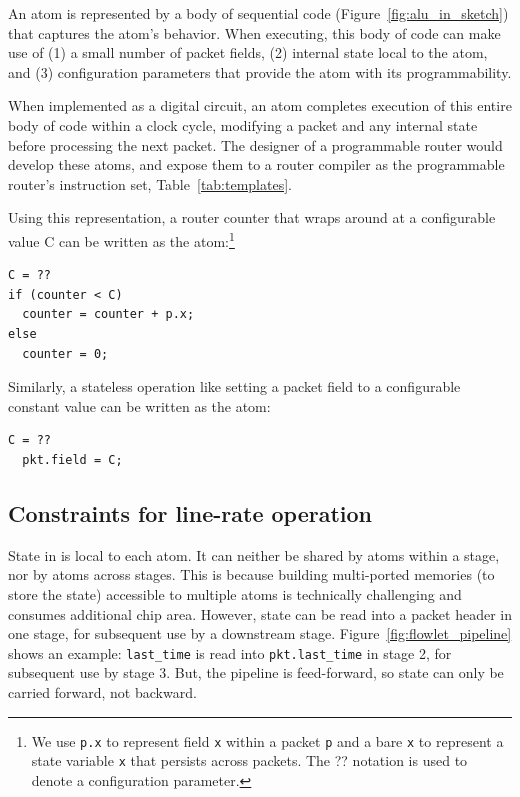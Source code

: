 An atom is represented by a body of sequential code
(Figure~\ref{fig:alu_in_sketch}) that captures the atom's behavior. When
executing, this body of code can make use of (1) a small number of packet
fields, (2) internal state local to the atom, and (3) configuration parameters
that provide the atom with its programmability.

When implemented as a digital circuit, an atom completes execution of this
entire body of code within a clock cycle, modifying a packet and any internal
state before processing the next packet. The designer of a programmable router
would develop these atoms, and expose them to a router compiler as the
programmable router's instruction set, \eg Table~\ref{tab:templates}.

Using this representation, a router counter that wraps around at a configurable
value C can be written as the atom:\footnote{We use {\tt p.x} to represent
field {\tt x} within a packet {\tt p} and a bare {\tt x} to represent a state
variable {\tt x} that persists across packets. The ?? notation is used to
denote a configuration parameter.}
\begin{lstlisting}[style=customc, numbers=none, frame=none]
C = ??
if (counter < C)
  counter = counter + p.x;
else
  counter = 0;
\end{lstlisting}

Similarly, a stateless operation like setting a packet field to a configurable
constant value can be written as the atom:
\begin{lstlisting}[style=customc, numbers=none, frame=none]
  C = ??
  pkt.field = C;
\end{lstlisting}

\subsection{Constraints for line-rate operation}
\label{s:atomConstraints}

 State in \absmachine is local to each atom.  It can
neither be shared by atoms within a stage, nor by atoms across stages. This is
because building multi-ported memories (to store the state) accessible to
multiple atoms is technically challenging and consumes additional chip area.
However, state can be read into a packet header in one stage, for subsequent
use by a downstream stage. Figure~\ref{fig:flowlet_pipeline} shows an example:
{\tt last\_time} is read into {\tt pkt.last\_time} in stage 2, for subsequent
use by stage 3.  But, the \absmachine pipeline is feed-forward, so state can
only be carried forward, not backward.

